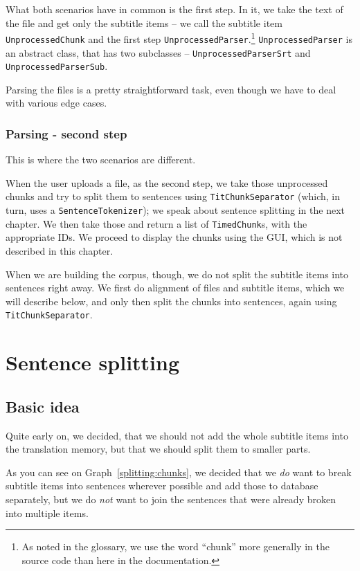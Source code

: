 What both scenarios have in common is the first step. In it, we take the text of the file and get only the subtitle items -- we call the subtitle item \texttt{UnprocessedChunk} and the first step \texttt{UnprocessedParser}.\footnote{As noted in the glossary, we use the word ``chunk'' more generally in the source code than here in the documentation.} \texttt{UnprocessedParser} is an abstract class, that has two subclasses -- \texttt{UnprocessedParserSrt} and \texttt{UnprocessedParserSub}.

Parsing the files is a pretty straightforward task, even though we have to deal with various edge cases.


\subsubsection*{Parsing - second step}
This is where the two scenarios are different. 

When the user uploads a file, as the second step, we take those unprocessed chunks and try to split them to sentences using \texttt{TitChunkSeparator} (which, in turn, uses a \texttt{SentenceTokenizer}); we speak about sentence splitting in the next chapter. We then take those and return a list of \texttt{TimedChunk}s, with the appropriate IDs. We proceed to display the chunks using the GUI, which is not described in this chapter.

When we are building the corpus, though, we do not split the subtitle items into sentences right away. We first do alignment of files and subtitle items, which we will describe below, and only then split the chunks into sentences, again using \texttt{TitChunkSeparator}.

\section{Sentence splitting}
\label{sentence_splitting}
\subsection*{Basic idea}
Quite early on, we decided, that we should not add the whole subtitle items into the translation memory, but that we should split them to smaller parts.

As you can see on Graph~\ref{splitting:chunks}, we decided that we \emph{do} want to break subtitle items into sentences wherever possible and add those to database separately, but we do \emph{not} want to join the sentences that were already broken into multiple items.

